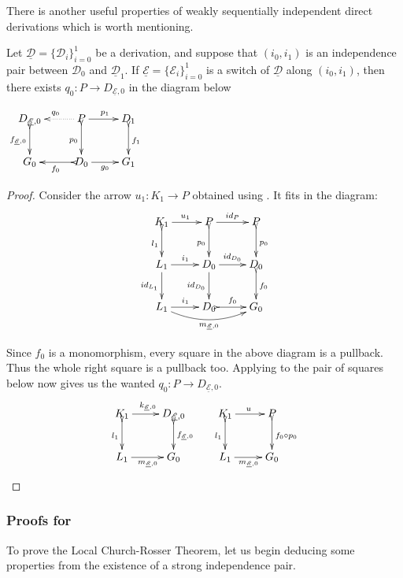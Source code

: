 \documentclass[a4paper,UKenglish,cleveref,pdftex, thm-restate,numberwithinsect,anonymous]{lipics}
\newcommand{\id}[1]{\mathsf{id}_{#1}}
\newcommand{\dder}[1]{\mathscr{#1}}
\newcommand{\der}[1]{\underline{\dder{#1}}}
\begin{document}
There is another
useful properties of weakly sequentially independent direct
derivations which is worth mentioning.

\noindent
\parbox{9.5cm}
{\begin{proposition}\label{lem:cose}Let
    $\der{D}=\{\dder{D}_i\}_{i=0}^1$ be a derivation, and suppose
    that $(i_0, i_1)$ is an independence pair between $\dder{D}_0$
    and $\der{D}_1$.  If $\der{E}=\{\dder{E}_i\}_{i=0}^1$ is a
    switch of $\der{D}$ along $(i_0, i_1)$, then there exists
    $q_0\colon P\to D_{\der{E},0}$ in the diagram
    below \end{proposition}}
\parbox{4cm}{$\xymatrix{D_{\der{E},0} \ar@{>->}[d]_{f_{\der{E},0}}&P
    \ar@{.>}[l]_{q_0} \ar[r]^{p_1} \ar@{>->}[d]_{p_0}& D_1
    \ar@{>->}[d]^{f_1}\\ G_{0}&D_0 \ar@{>->}[l]^{f_0}\ar[r]_{g_0}&
    G_1}$}

\begin{proof}
  Consider the arrow $u_1\colon K_1\to P$ obtained using
  . It fits in the diagram:
  \[\xymatrix{K_1 \ar[r]^{u_1} \ar@{>->}[d]_{l_1}&P
      \ar[r]^{\id{P}}\ar@{>->}[d]_{p_0}& P\ar@{>->}[d]^{p_0}\\L_1
      \ar[d]_{\id{L_1}}\ar[r]^{i_1}&D_0 \ar[r]^{\id{D_0}}
      \ar[d]_{\id{D_0}}& D_{0} \ar@{>->}[d]^{f_0}\\
      L_1\ar[r]^{i_1} \ar@/_.4cm/[rr]_{m_{\der{E},0}}&D_0
      \ar@{>->}[r]^{f_0}&G_0}\]

  Since $f_0$ is a monomorphism, every square in the above diagram
  is a pullback. Thus the whole right square is a pullback too.
  Applying  to the pair of squares below now gives
  us the wanted $q_0\colon P\to D_{\der{E},0}$.
  \[\xymatrix{K_1 \ar@{>->}[d]_{l_1}\ar[r]^{k_{\der{E},0}}&
      D_{\der{E},0} \ar@{>->}[d]^{f_{\der{E},0}} & K_1 \ar[r]^{u}
      \ar@{>->}[d]_{l_1}& P \ar@{>->}[d]^{f_0\circ
        p_0}\\L_1\ar[r]_{m_{\der{E},0}}&G_0 &L_1
      \ar[r]_{m_{\der{E},0}}&G_0} \]
\end{proof}

\subsubsection{Proofs for }

To prove the Local Church-Rosser Theorem, let us begin deducing some properties from the existence of a strong independence pair. 
\end{document}
